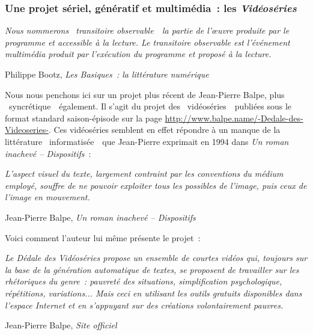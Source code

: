 \documentclass{article}
\newenvironment{citationbox}
{\begin{center}
		\begin{minipage}{.8\textwidth}
		}
		{
		\end{minipage}	
\end{center}
}
\begin{document}
			\subsubsection{Une projet sériel, génératif et multimédia~: les \textit{Vidéoséries}}
				\begin{citationbox}
					\textit{Nous nommerons \guillemotleft~transitoire observable~\guillemotright~la partie de l’œuvre produite par le programme et accessible à la lecture. Le transitoire observable est l’événement multimédia produit par l'exécution du programme et proposé à la lecture.}
					\begin{flushright}
						Philippe Bootz, \textit{Les Basiques~: la littérature numérique} \autocite{bootz2006}
					\end{flushright}
				\end{citationbox}
				Nous nous penchons ici sur un projet plus récent de Jean-Pierre Balpe, plus \guillemotleft~syncrétique~\guillemotright~également. Il s'agit du projet des \guillemotleft~vidéoséries~\guillemotright~publiées sous le format standard saison-épisode sur la page \href{http://www.balpe.name/-Dedale-des-Videoseries-}{http://www.balpe.name/-Dedale-des-Videoseries-}. Ces vidéoséries semblent en effet répondre à un manque de la littérature \guillemotleft~informatisée~\guillemotright~que Jean-Pierre exprimait en 1994 dans \textit{Un roman inachevé -- Dispositifs} : 
				\begin{citationbox}
					\textit{L'aspect visuel du texte, largement contraint par les conventions du médium employé, souffre de ne pouvoir exploiter tous les possibles de l'image, puis ceux de l'image en mouvement.}
					\begin{flushright}
						Jean-Pierre Balpe, \textit{Un roman inachevé -- Dispositifs} \autocite{balpe1994}
					\end{flushright}
				\end{citationbox}
				Voici comment l'auteur lui même présente le projet~:
				\begin{citationbox}
					\textit{Le Dédale des Vidéoséries propose un ensemble de courtes vidéos qui, toujours sur la base de la génération automatique de textes, se proposent de travailler sur les rhétoriques du genre : pauvreté des situations, simplification psychologique, répétitions, variations... Mais ceci en utilisant les outils gratuits disponibles dans l'espace Internet et en s'appuyant sur des créations volontairement pauvres.}
					\begin{flushright}
						Jean-Pierre Balpe, \textit{Site officiel} \autocite{balpe_site}
					\end{flushright}
				\end{citationbox}
				
\end{document}
